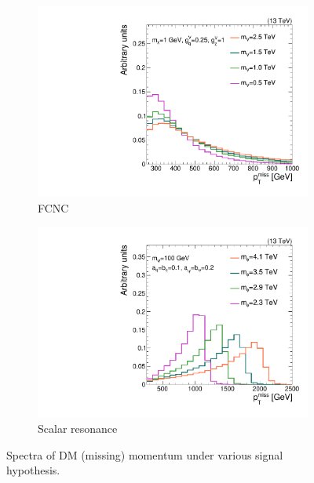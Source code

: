 \begin{figure}[!ht]
    \begin{center}
        \begin{subfigure}[t]{0.49\textwidth}
            \includegraphics[width=\textwidth]{figures/monotop/diagrams/fcnc_pfmet.pdf}
            \caption{FCNC}
        \end{subfigure}
        \begin{subfigure}[t]{0.49\textwidth}
            \includegraphics[width=\textwidth]{figures/monotop/diagrams/res_pfmet.pdf}
            \caption{Scalar resonance}
        \end{subfigure}
        \caption{Spectra of DM (missing) momentum under various signal hypothesis.}
        \label{fig:mt:shapes}
    \end{center}
\end{figure}

